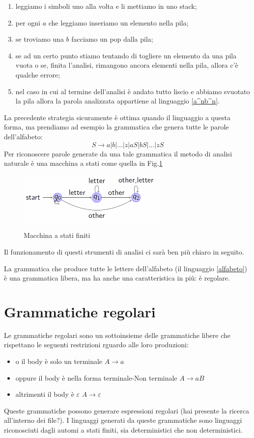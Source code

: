 \documentclass[class=book, crop=false, oneside, 12pt]{standalone}
\begin{document}
\begin{enumerate}
    \item leggiamo i simboli uno alla volta e li mettiamo in uno stack;
    \item per ogni \(a\) che leggiamo inseriamo un elemento nella pila;
    \item se troviamo una \(b\) facciamo un pop dalla pila;
    \item se ad un certo punto stiamo tentando di togliere un elemento da una pila vuota o se, finita l’analisi, rimangono ancora elementi nella pila, allora c’è qualche errore;
    \item nel caso in cui al termine dell’analisi è andato tutto liscio e abbiamo svuotato la pila allora la parola analizzata appartiene al linguaggio \ref{a^nb^n}.
\end{enumerate} 
La precedente strategia sicuramente è ottima quando il linguaggio a questa forma, ma prendiamo ad esempio la grammatica che genera tutte le parole dell’alfabeto:
\begin{equation}
    \label{alfabeto}
    S \to a | b | … | z | aS | bS | … | zS
\end{equation}
Per riconoscere parole generate da una tale grammatica il metodo di analisi naturale è una macchina a stati come quella in Fig.\ref{macchina_a_stati_finiti}
\begin{figure}
    \centering
    \includegraphics[width=.5\textwidth,keepaspectratio]{macchina_a_stati_finiti}
    \label{macchina_a_stati_finiti}
    \caption{Macchina a stati finiti}
\end{figure}
Il funzionamento di questi strumenti di analisi ci sarà ben più chiaro in seguito.

La grammatica che produce tutte le lettere dell’alfabeto (il linguaggio \ref{alfabeto}) è una grammatica libera, ma ha anche una caratteristica in più: è regolare.


\section{Grammatiche regolari}

Le grammatiche regolari sono un sottoinsieme delle grammatiche libere che rispettano le seguenti restrizioni rguardo alle loro produzioni:
\begin{itemize}
    \item o il body è solo un terminale \(A \to a\)
    \item oppure il body è nella forma terminale-Non terminale \(A \to aB\)  
    \item altrimenti il body è \(\varepsilon\) \(A \to \varepsilon\)
\end{itemize}
Queste grammatiche possono generare espressioni regolari (hai presente la ricerca all’interno dei file?).
I linguaggi generati da queste grammatiche sono linguaggi riconosciuti dagli automi a stati finiti, sia deterministici che non deterministici.
\end{document}
